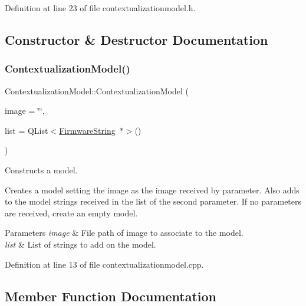 Definition at line 23 of file contextualizationmodel.\+h.



\subsection{Constructor \& Destructor Documentation}
\mbox{\label{classContextualizationModel_a109126afb677af159e77adecf36fb6f2}} 
\subsubsection{\texorpdfstring{Contextualization\+Model()}{ContextualizationModel()}}
{\footnotesize\ttfamily Contextualization\+Model\+::\+Contextualization\+Model (\begin{DoxyParamCaption}\item[{Q\+String}]{image = {\ttfamily \char`\"{}\char`\"{}},  }\item[{Q\+List$<$ \mbox{\hyperlink{classFirmwareString}{Firmware\+String}} $\ast$$>$}]{list = {\ttfamily QList$<$\mbox{\hyperlink{classFirmwareString}{Firmware\+String}}~$\ast$$>$()} }\end{DoxyParamCaption})}



Constructs a model. 

Creates a model setting the image as the image received by parameter. Also adds to the model strings received in the list of the second parameter. If no parameters are received, create an empty model. 
\begin{DoxyParams}{Parameters}
{\em image} & File path of image to associate to the model. \\
\hline
{\em list} & List of strings to add on the model. \\
\hline
\end{DoxyParams}


Definition at line 13 of file contextualizationmodel.\+cpp.



\subsection{Member Function Documentation}
\mbox{\label{classContextualizationModel_aa87bafc64440304e8d9efd7f23f9b897}} 

